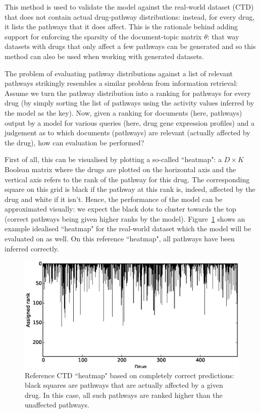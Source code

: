 \documentclass[12pt,a4paper,twoside,openright]{report}
\begin{document}
This method is used to validate the model against the real-world dataset (CTD) that does not contain actual drug-pathway distributions: instead, for every drug, it lists the pathways that it does affect. This is the rationale behind adding support for enforcing the sparsity of the document-topic matrix $\theta$: that way datasets with drugs that only affect a few pathways can be generated and so this method can also be used when working with generated datasets.

The problem of evaluating pathway distributions against a list of relevant pathways strikingly resembles a similar problem from information retrieval: Assume we turn the pathway distribution into a ranking for pathways for every drug (by simply sorting the list of pathways using the activity values inferred by the model as the key). Now, given a ranking for documents (here, pathways) output by a model for various queries (here, drug gene expression profiles) and a judgement as to which documents (pathways) are relevant (actually affected by the drug), how can evaluation be performed?

First of all, this can be visualised by plotting a so-called ``heatmap": a $D \times K$ Boolean matrix where the drugs are plotted on the horizontal axis and the vertical axis refers to the rank of the pathway for this drug. The corresponding square on this grid is black if the pathway at this rank is, indeed, affected by the drug and white if it isn't. Hence, the performance of the model can be approximated visually: we expect the black dots to cluster towards the top (correct pathways being given higher ranks by the model). Figure~\ref{fig:ref-ctd-heatmap} shows an example idealised ``heatmap" for the real-world dataset which the model will be evaluated on as well. On this reference ``heatmap", all pathways have been inferred correctly.

\begin{figure}[!htb]
\includegraphics[width=\textwidth]{ref-ctd-heatmap.eps}
\caption{Reference CTD ``heatmap" based on completely correct predictions: black squares are pathways that are actually affected by a given drug. In this case, all such pathways are ranked higher than the unaffected pathways.}
\label{fig:ref-ctd-heatmap}
\end{figure}
\end{document}
